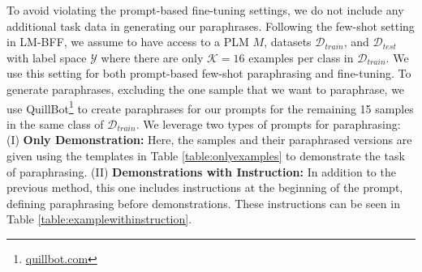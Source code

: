 \documentclass[11pt]{article}
\begin{document}
To avoid violating the prompt-based fine-tuning settings, we do not include any additional task data in generating our paraphrases. Following the few-shot setting in LM-BFF, we assume to have access to a PLM $M$, datasets $\mathcal{D}_{train}$, and $\mathcal{D}_{test}$ with label space $\mathcal{Y}$ where there are only $\mathcal{K} = 16$ examples per class in $\mathcal{D}_{train}$. We use this setting for both prompt-based few-shot paraphrasing and fine-tuning. To generate paraphrases, excluding the one sample that we want to paraphrase, we use QuillBot\footnote{\url{quillbot.com}} to create paraphrases for our prompts for the remaining 15 samples in the same class of $\mathcal{D}_{train}$. We leverage two types of prompts for paraphrasing:
    (I) \textbf{Only Demonstration:} Here, the samples and their paraphrased versions are given using the templates in Table \ref{table:onlyexamples} to demonstrate the task of paraphrasing. 
    (II) \textbf{Demonstrations with Instruction:} In addition to the previous method, this one includes instructions at the beginning of the prompt, defining paraphrasing before demonstrations. These instructions can be seen in Table \ref{table:examplewithinstruction}.
\end{document}
